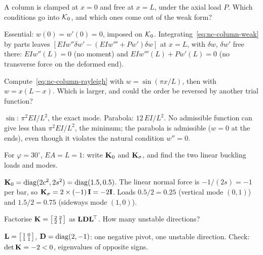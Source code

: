 \label{sec:nc-exo}

\label{exo:nc-natural}
%
A column is clamped at $x = 0$ and free at $x = L$, under the axial load $P$. Which
conditions go into $\mathcal{K}_0$, and which ones come out of the weak form?
\begin{solution}
Essential: $w(0) = w'(0) = 0$, imposed on $\mathcal{K}_0$. Integrating~\eqref{eq:nc-column-weak} by
parts leaves $[EIw''\delta w' - (EIw''' + Pw')\delta w]$ at $x = L$, with $\delta w$, $\delta w'$
free there: $EIw''(L) = 0$ (no moment) and $EIw'''(L) + Pw'(L) = 0$ (no transverse force on
the deformed end).
\end{solution}

\label{exo:nc-sine}
%
Compute~\eqref{eq:nc-column-rayleigh} with $w = \sin(\pi x/L)$, then with $w = x(L - x)$. Which is
larger, and could the order be reversed by another trial function?
\begin{solution}
$\sin$: $\pi^2EI/L^2$, the exact mode. Parabola: $12\,EI/L^2$. No admissible function can give
less than $\pi^2EI/L^2$, the minimum; the parabola is admissible ($w = 0$ at the ends), even
though it violates the natural condition $w'' = 0$.
\end{solution}

\label{exo:nc-lba-hand}
%
For $\varphi = 30^\circ$, $EA = L = 1$: write $\mathbf{K}_0$ and $\mathbf{K}_\sigma$, and find the two
linear buckling loads and modes.
\begin{solution}
$\mathbf{K}_0 = \operatorname{diag}(2c^2, 2s^2) = \operatorname{diag}(1.5, 0.5)$. The linear normal force is $-1/(2s) = -1$ per
bar, so $\mathbf{K}_\sigma = 2\times(-1)\,\mathbf{I} = -2\mathbf{I}$. Loads $0.5/2 = 0.25$ (vertical mode $(0,1)$)
and $1.5/2 = 0.75$ (sideways mode $(1,0)$).
\end{solution}

\label{exo:nc-pivots}
%
Factorise $\mathbf{K} = \bigl[\begin{smallmatrix} 2 & 2\\ 2 & 1\end{smallmatrix}\bigr]$ as
$\mathbf{L}\mathbf{D}\mathbf{L}^{\!\top}$. How many unstable directions?
\begin{solution}
$\mathbf{L} = \bigl[\begin{smallmatrix}1&0\\1&1\end{smallmatrix}\bigr]$, $\mathbf{D} = \operatorname{diag}(2,-1)$:
one negative pivot, one unstable direction. Check: $\det\mathbf{K} = -2 < 0$, eigenvalues of
opposite signs.
\end{solution}

